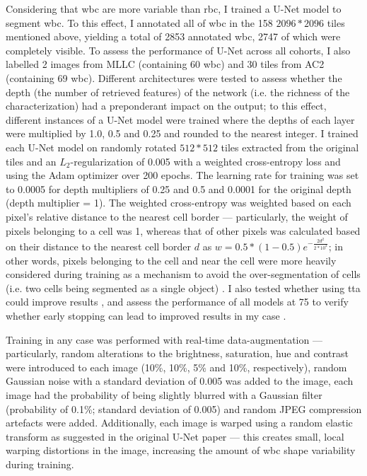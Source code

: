 Considering that \ac{wbc} are more variable than \ac{rbc}, I trained a U-Net model \cite{Ronneberger2015-do} to segment \ac{wbc}. To this effect, I annotated all of \ac{wbc} in the 158 $2096*2096$ tiles mentioned above, yielding a total of 2853 annotated \ac{wbc}, 2747 of which were completely visible. To assess the performance of U-Net across all cohorts, I also labelled 2 images from MLLC (containing 60 \ac{wbc}) and 30 tiles from AC2 (containing 69 \ac{wbc}). Different architectures were tested to assess whether the depth (the number of retrieved features) of the network (i.e. the richness of the characterization) had a preponderant impact on the output; to this effect, different instances of a U-Net model were trained where the depths of each layer were multiplied by 1.0, 0.5 and 0.25 and rounded to the nearest integer. I trained each U-Net model on randomly rotated $512*512$ tiles extracted from the original tiles and an $L_2$-regularization of 0.005 with a weighted cross-entropy loss and using the Adam optimizer \cite{Kingma2014-zd} over 200 epochs. The learning rate for training was set to 0.0005 for depth multipliers of 0.25 and 0.5 and 0.0001 for the original depth (depth multiplier = 1). The weighted cross-entropy was weighted based on each pixel's relative distance to the nearest cell border --- particularly, the weight of pixels belonging to a cell was 1, whereas that of other pixels was calculated based on their distance to the nearest cell border $d$ as $w = 0.5 * (1-0.5)e^{-\frac{2d^2}{2*10^2}}$; in other words, pixels belonging to the cell and near the cell were more heavily considered during training as a mechanism to avoid the over-segmentation of cells (i.e. two cells being segmented as a single object) \cite{Ronneberger2015-do}. I also tested whether using \ac{tta} could improve results \cite{Moshkov2020-rc}, and assess the performance of all models at 75 to verify whether early stopping can lead to improved results in my case \cite{Prechelt2012-xf}. 

Training in any case was performed with real-time data-augmentation --- particularly, random alterations to the brightness, saturation, hue and contrast were introduced to each image (10\%, 10\%, 5\% and 10\%, respectively), random Gaussian noise with a standard deviation of 0.005 was added to the image, each image had the probability of being slightly blurred with a Gaussian filter (probability of 0.1\%; standard deviation of 0.005) and random JPEG compression artefacts were added. Additionally, each image is warped using a random elastic transform as suggested in the original U-Net paper \cite{Ronneberger2015-do} --- this creates small, local warping distortions in the image, increasing the amount of \ac{wbc} shape variability during training. 

